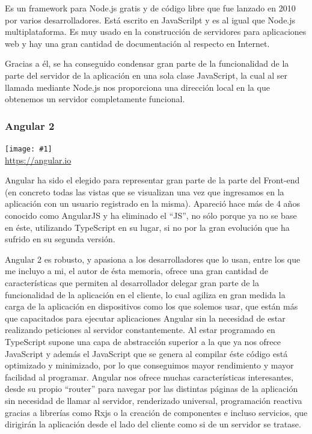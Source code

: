 \documentclass[11pt,openany]{book}
\newcommand{\logo}[2]{\medskip\begin{center}\texttt{[image: \#1]}\\\scriptsize\url{#2}\end{center}\bigskip}
\begin{document}
Es un framework para Node.js gratis y de código libre que fue lanzado en 2010 por varios desarrolladores\cite{5}. Está escrito en JavaScrilpt y es al igual que Node.js multiplataforma. Es muy usado en la construcción de servidores para aplicaciones web y hay una gran cantidad de documentación al respecto en Internet.

Gracias a él, se ha conseguido condensar gran parte de la funcionalidad de la parte del servidor de la aplicación en una sola clase JavaScript, la cual al ser llamada mediante Node.js nos proporciona una dirección local en la que obtenemos un servidor completamente funcional.

\subsubsection{Angular 2}

\logo{logos/angular2.png}{https://angular.io}

Angular ha sido el elegido para representar gran parte de la parte del Front-end (en concreto todas las vistas que se visualizan una vez que ingresamos en la aplicación con un usuario registrado en la misma). Apareció hace más de 4 años conocido como AngularJS\cite{6} y ha eliminado el ``JS'', no sólo porque ya no se base en éste, utilizando TypeScript en su lugar, si no por la gran evolución que ha sufrido en su segunda versión.

Angular 2 es robusto, y apasiona a los desarrolladores que lo usan, entre los que me incluyo a mi, el autor de ésta memoria, ofrece una gran cantidad de características que permiten al desarrollador delegar gran parte de la funcionalidad de la aplicación en el cliente, lo cual agiliza en gran medida la carga de la aplicación en dispositivos como los que solemos usar, que están más que capacitados para ejecutar aplicaciones Angular sin la necesidad de estar realizando peticiones al servidor constantemente. Al estar programado en TypeScript supone una capa de abstracción superior a la que ya nos ofrece JavaScript y además el JavaScript que se genera al compilar éste código está optimizado y minimizado, por lo que conseguimos mayor rendimiento y mayor facilidad al programar. Angular nos ofrece muchas características interesantes, desde su propio ``router'' para navegar por las distintas páginas de la aplicación sin necesidad de llamar al servidor, renderizado universal, programación reactiva gracias a librerías como Rxjs o la creación de componentes e incluso servicios, que dirigirán la aplicación desde el lado del cliente como si de un servidor se tratase.
\end{document}
